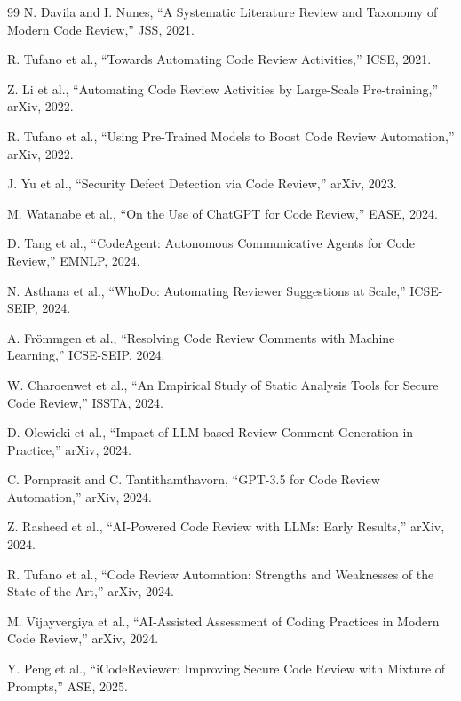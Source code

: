 \documentclass[11pt,a4paper,onecolumn]{article}
\begin{document}
\begin{thebibliography}{99}
N. Davila and I. Nunes, ``A Systematic Literature Review and Taxonomy of Modern Code Review,'' JSS, 2021.

R. Tufano et al., ``Towards Automating Code Review Activities,'' ICSE, 2021.

Z. Li et al., ``Automating Code Review Activities by Large-Scale Pre-training,'' arXiv, 2022.

R. Tufano et al., ``Using Pre-Trained Models to Boost Code Review Automation,'' arXiv, 2022.

J. Yu et al., ``Security Defect Detection via Code Review,'' arXiv, 2023.

M. Watanabe et al., ``On the Use of ChatGPT for Code Review,'' EASE, 2024.

D. Tang et al., ``CodeAgent: Autonomous Communicative Agents for Code Review,'' EMNLP, 2024.

N. Asthana et al., ``WhoDo: Automating Reviewer Suggestions at Scale,'' ICSE-SEIP, 2024.

A. Frömmgen et al., ``Resolving Code Review Comments with Machine Learning,'' ICSE-SEIP, 2024.

W. Charoenwet et al., ``An Empirical Study of Static Analysis Tools for Secure Code Review,'' ISSTA, 2024.

D. Olewicki et al., ``Impact of LLM-based Review Comment Generation in Practice,'' arXiv, 2024.

C. Pornprasit and C. Tantithamthavorn, ``GPT-3.5 for Code Review Automation,'' arXiv, 2024.

Z. Rasheed et al., ``AI-Powered Code Review with LLMs: Early Results,'' arXiv, 2024.

R. Tufano et al., ``Code Review Automation: Strengths and Weaknesses of the State of the Art,'' arXiv, 2024.

M. Vijayvergiya et al., ``AI-Assisted Assessment of Coding Practices in Modern Code Review,'' arXiv, 2024.

Y. Peng et al., ``iCodeReviewer: Improving Secure Code Review with Mixture of Prompts,'' ASE, 2025.


\end{thebibliography}
\end{document}
